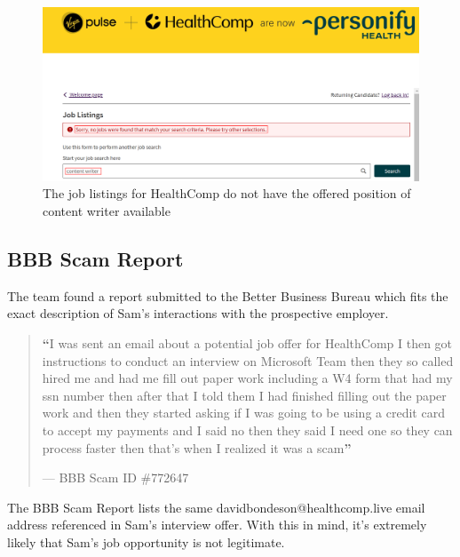\begin{fullwidth}
\begin{figure}[H] %
    \label{sec:Fig8}
    \centering
    \includegraphics[width=1\linewidth]{assets/realJobPosting.png}
    \captionsetup{justification=centering}
    \caption{The job listings for HealthComp do not have the offered position of content writer available}
\end{figure}

\subsection{BBB Scam Report}
\label{sec:BBB Scam Report}

The team found a report submitted to the Better Business Bureau which fits the exact description of Sam's interactions with the prospective employer.

\begin{quote}
	\textbf{\LARGE ``}I was sent an email about a potential job offer for HealthComp I then got instructions to conduct an interview on Microsoft Team then they so called hired me and had me fill out paper work including a W4 form that had my ssn number then after that I told them I had finished filling out the paper work and then they started asking if I was going to be using a credit card to accept my payments and I said no then they said I need one so they can process faster then that's when I realized it was a scam\textbf{''}
	
	\hfill--- BBB Scam ID \#772647 \autocite{BBB:2023}
\end{quote}

The BBB Scam Report lists the same davidbondeson@healthcomp.live email address referenced in Sam's interview offer. With this in mind, it's extremely likely that Sam's job opportunity is not legitimate.
\end{fullwidth}